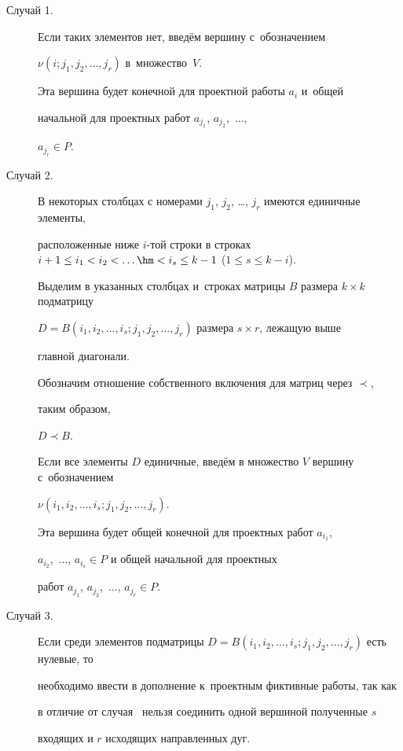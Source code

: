 \begin{description}

\item[{\sf Случай 1.}]  

Если таких элементов нет, введём вершину с~обозначением 

$\nu (i; j_1, j_2, \dots, j_{r})$  в~множество~$V$.

Эта вершина будет конечной для проектной работы $a_i$ и~общей

начальной для проектных работ $a_{j_1}$, $a_{j_2}$,~$\dots$,

$a_{j_r} \in P$.



\item[{\sf Случай 2.}]  

В некоторых столбцах с номерами $j_1$, $j_2$, \dots, $j_{r}$ имеются единичные элементы,

расположенные ниже $i$-той строки в строках $i+1\leq i_1<i_2<\dots \hm<i_{s}\leq k-1$ ($1\leq s \leq k-i$). 

Выделим в указанных столбцах и~строках матрицы $B$ размера $k{\times}k$ подматрицу 

$D=B(i_1, i_2, \dots, i_{s}; j_1, j_2, \dots, j_{r})$ размера  $s{\times} r$, лежащую выше

главной диагонали.



Обозначим отношение  собственного включения для матриц через $\prec$, 



таким образом,

$D\prec B$.



Если все элементы $D$ единичные, введём в множество $V$ вершину с~обозначением 

$\nu(i_1, i_2, \dots, i_{s}; j_1, j_2, \dots, j_{r})$.

Эта вершина будет общей конечной для проектных работ $a_{i_1}$,

$a_{i_2}$,~$\dots$, $a_{i_{s}} \in P$ и общей начальной для проектных

работ $a_{j_1}$, $a_{j_2}$,~$\dots$, $a_{j_{r}} \in P$.



\item[{\sf Случай 3.}]  

Если среди элементов подматрицы $D=B(i_1, i_2, \dots, i_{s}; j_1, j_2, \dots, j_{r})$ есть нулевые, то

необходимо ввести в дополнение к~проектным фиктивные работы, так как

в отличие от случая~{} нельзя соединить одной вершиной полученные $s$

входящих и $r$ исходящих направленных дуг. 

\end{description}





